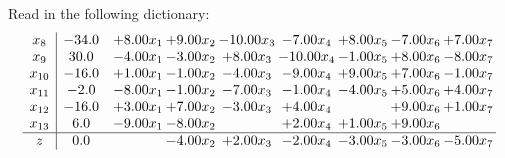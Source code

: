 \documentclass[9pt]{article}
\begin{document}
Read in the following dictionary:
\[\begin{array}{c| c c@{\hskip 2pt} c@{\hskip 2pt} c@{\hskip 2pt} c@{\hskip 2pt} c@{\hskip 2pt} c@{\hskip 2pt} c@{\hskip 2pt} }
 x_{8}   &  -34.0 & +  8.00 x_{1} & +  9.00 x_{2} & -10.00 x_{3} & -7.00 x_{4} & +  8.00 x_{5} & -7.00 x_{6} & +  7.00 x_{7}\\
 x_{9}   &  30.0 & -4.00 x_{1} & -3.00 x_{2} & +  8.00 x_{3} & -10.00 x_{4} & -1.00 x_{5} & +  8.00 x_{6} & -8.00 x_{7}\\
 x_{10}   &  -16.0 & +  1.00 x_{1} & -1.00 x_{2} & -4.00 x_{3} & -9.00 x_{4} & +  9.00 x_{5} & +  7.00 x_{6} & -1.00 x_{7}\\
 x_{11}   &  -2.0 & -8.00 x_{1} & -1.00 x_{2} & -7.00 x_{3} & -1.00 x_{4} & -4.00 x_{5} & +  5.00 x_{6} & +  4.00 x_{7}\\
 x_{12}   &  -16.0 & +  3.00 x_{1} & +  7.00 x_{2} & -3.00 x_{3} & +  4.00 x_{4} &   & +  9.00 x_{6} & +  1.00 x_{7}\\
 x_{13}   &  6.0 & -9.00 x_{1} & -8.00 x_{2} &   & +  2.00 x_{4} & +  1.00 x_{5} & +  9.00 x_{6} &   \\
\hline
z    &  0.0  &   & -4.00 x_{2} & +  2.00 x_{3} & -2.00 x_{4} & -3.00 x_{5} & -3.00 x_{6} & -5.00 x_{7}\\
\end{array}\]
\end{document}
